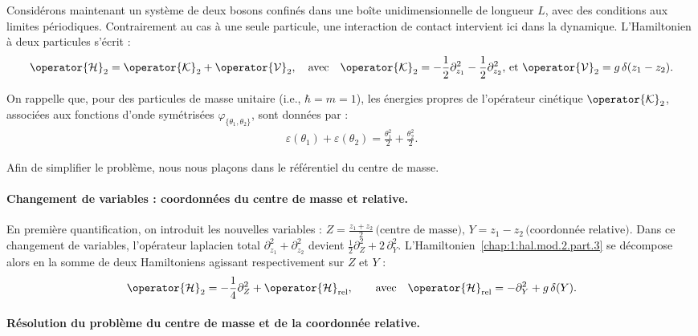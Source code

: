Considérons maintenant un système de deux bosons confinés dans une boîte unidimensionnelle de longueur \(L\), avec des conditions aux limites périodiques. Contrairement au cas à une seule particule, une interaction de contact intervient ici dans la dynamique. L’Hamiltonien à deux particules s’écrit :
\begin{eqnarray}
	\operator{\mathcal{H}}_2 = \operator{\mathcal{K}}_2 + \operator{\mathcal{V}}_2, \quad \text{avec} \quad \operator{\mathcal{K}}_2 = - \frac{1}{2} \partial_{z_1}^2 - \frac{1}{2} \partial_{z_2}^2, \, \text{et} \,\, \operator{\mathcal{V}}_2 = g \, \delta(z_1 - z_2). \label{chap:1:hal.mod.2.part.3}
\end{eqnarray}

On rappelle que, pour des particules de masse unitaire (i.e., \(\hbar = m = 1\)), les énergies propres de l’opérateur cinétique \(\operator{\mathcal{K}}_2\), associées aux fonctions d’onde symétrisées \(\varphi_{\{ \theta_1 , \theta_2 \}}\), sont données par :
\begin{eqnarray}
	\varepsilon(\theta_1) + \varepsilon(\theta_2) = \frac{\theta_1^2}{2} + \frac{\theta_2^2}{2}.
\end{eqnarray}

Afin de simplifier le problème, nous nous plaçons dans le référentiel du centre de masse.

\paragraph{Changement de variables : coordonnées du centre de masse et relative.}

En première quantification, on introduit les nouvelles variables :
\(
Z = \frac{z_1 + z_2}{2} \, \text{(centre de masse)}, \, Y = z_1 - z_2 \, \text{(coordonnée relative)}.
\)
Dans ce changement de variables, l’opérateur laplacien total 
\(
\partial_{z_1}^2 + \partial_{z_2}^2 
\)
devient
\(
\frac{1}{2} \partial_Z^2 + 2 \, \partial_Y^2.
\)
L’Hamiltonien~\eqref{chap:1:hal.mod.2.part.3} se décompose alors en la somme de deux Hamiltoniens agissant respectivement sur \(Z\) et \(Y\) :
\begin{eqnarray}\label{chap:1:hal.mod.2.part.4}
	\operator{\mathcal{H}}_2 = -\frac{1}{4} \partial_Z^2 + \operator{\mathcal{H}}_{\text{rel}}, \qquad \text{avec} \quad \operator{\mathcal{H}}_{\text{rel}} = - \partial_Y^2 + g \, \delta(Y).
\end{eqnarray}

\paragraph{Résolution du problème du centre de masse et de la coordonnée relative.}

